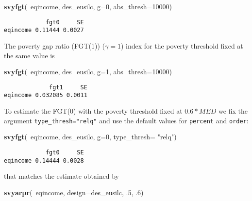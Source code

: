 \documentclass[]{book}
\newenvironment{Shaded}{\begin{snugshade}}{\end{snugshade}}
\newcommand{\KeywordTok}[1]{\textcolor[rgb]{0.13,0.29,0.53}{\textbf{{#1}}}}
\newcommand{\DataTypeTok}[1]{\textcolor[rgb]{0.13,0.29,0.53}{{#1}}}
\newcommand{\DecValTok}[1]{\textcolor[rgb]{0.00,0.00,0.81}{{#1}}}
\newcommand{\StringTok}[1]{\textcolor[rgb]{0.31,0.60,0.02}{{#1}}}
\newcommand{\NormalTok}[1]{{#1}}
\begin{document}
\begin{Shaded}
\begin{Highlighting}[]
\KeywordTok{svyfgt}\NormalTok{(~eqincome, des_eusilc, }\DataTypeTok{g=}\DecValTok{0}\NormalTok{, }\DataTypeTok{abs_thresh=}\DecValTok{10000}\NormalTok{)}
\end{Highlighting}
\end{Shaded}

\begin{verbatim}
            fgt0     SE
eqincome 0.11444 0.0027
\end{verbatim}

The poverty gap ratio (FGT(1)) (\(\gamma=1\)) index for the poverty
threshold fixed at the same value is

\begin{Shaded}
\begin{Highlighting}[]
\KeywordTok{svyfgt}\NormalTok{(~eqincome, des_eusilc, }\DataTypeTok{g=}\DecValTok{1}\NormalTok{, }\DataTypeTok{abs_thresh=}\DecValTok{10000}\NormalTok{)}
\end{Highlighting}
\end{Shaded}

\begin{verbatim}
             fgt1     SE
eqincome 0.032085 0.0011
\end{verbatim}

To estimate the FGT(0) with the poverty threshold fixed at \(0.6* MED\)
we fix the argument \texttt{type\_thresh="relq"} and use the default
values for \texttt{percent} and \texttt{order}:

\begin{Shaded}
\begin{Highlighting}[]
\KeywordTok{svyfgt}\NormalTok{(~eqincome, des_eusilc, }\DataTypeTok{g=}\DecValTok{0}\NormalTok{, }\DataTypeTok{type_thresh=} \StringTok{"relq"}\NormalTok{)}
\end{Highlighting}
\end{Shaded}

\begin{verbatim}
            fgt0     SE
eqincome 0.14444 0.0028
\end{verbatim}

that matches the estimate obtained by

\begin{Shaded}
\begin{Highlighting}[]
\KeywordTok{svyarpr}\NormalTok{(~eqincome, }\DataTypeTok{design=}\NormalTok{des_eusilc, .}\DecValTok{5}\NormalTok{, .}\DecValTok{6}\NormalTok{)}
\end{Highlighting}
\end{Shaded}
\end{document}

